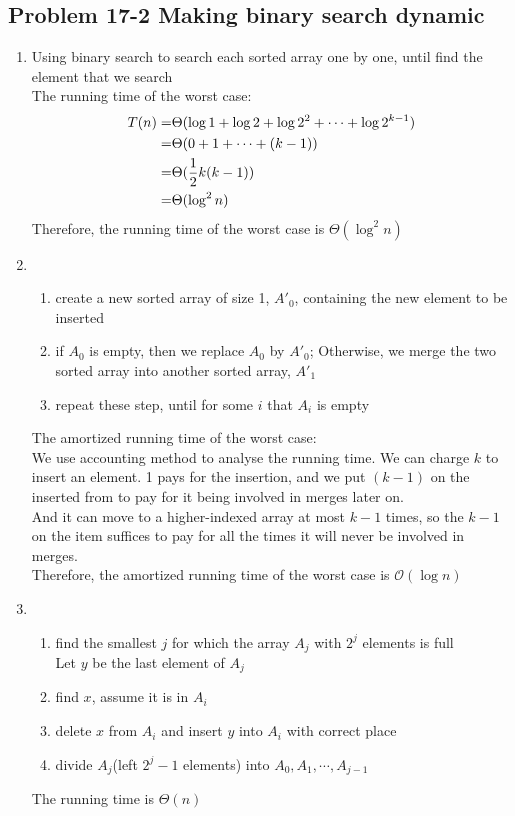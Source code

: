 \subsection*{Problem 17-2 Making binary search dynamic}
\begin{enumerate}
	\item	Using binary search to search each sorted array one by one, until find the element that we search \\
		The running time of the worst case:
		\begin{equation} \notag
		\begin{aligned}
			T(n)	=& \Theta(\log 1 + \log 2 + \log 2^2 + \cdots + \log 2^{k - 1}) \\
				=& \Theta(0 + 1 + \cdots + (k - 1)) \\
				=& \Theta(\frac{1}{2}k(k - 1)) \\
				=& \Theta(\log^2 n)
		\end{aligned}
		\end{equation}
		Therefore, the running time of the worst case is $\Theta(\log^2 n)$
	\item	\begin{enumerate}
			\item	create a new sorted array of size 1, $A'_0$, containing the new element to be inserted
			\item	if $A_0$ is empty, then we replace $A_0$ by $A'_0$; Otherwise, we merge the two sorted array into another sorted array, $A'_1$
			\item	repeat these step, until for some $i$ that $A_i$ is empty
		\end{enumerate}
		The amortized running time of the worst case: \\
		
		We use accounting method to analyse the running time. We can charge $k$ to insert an element. 1 pays for the insertion, and we put $(k - 1)$ on the inserted from to pay for it being involved in merges later on. \\
		And it can move to a higher-indexed array at most $k - 1$ times, so the $k - 1$ on the item suffices to pay for all the times it will never be involved in merges. \\
		Therefore, the amortized running time of the worst case is $\mathcal{O}(\log n)$
	\item	\begin{enumerate}
			\item	find the smallest $j$ for which the array $A_j$ with $2^j$ elements is full \\
				Let $y$ be the last element of $A_j$
			\item	find $x$, assume it is in $A_i$
			\item	delete $x$ from $A_i$ and insert $y$ into $A_i$ with correct place
			\item	divide $A_j$(left $2^j - 1$ elements) into $A_0, A_1, \cdots, A_{j - 1}$
		\end{enumerate}
		The running time is $\Theta(n)$
\end{enumerate}


